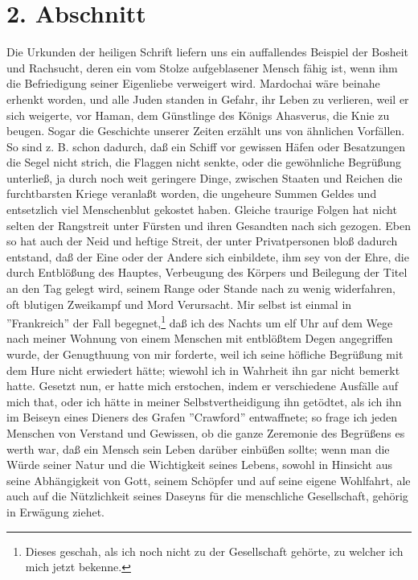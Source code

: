 \section{2. Abschnitt}

Die Urkunden der heiligen Schrift liefern uns ein auffallendes Beispiel der Bosheit und Rachsucht, deren ein vom Stolze aufgeblasener Mensch fähig ist, wenn ihm die Befriedigung seiner Eigenliebe verweigert wird. Mardochai wäre beinahe erhenkt worden, und alle Juden standen in Gefahr, ihr Leben zu verlieren, weil er sich weigerte, vor Haman, dem Günstlinge des Königs Ahasverus, die Knie zu beugen. Sogar die Geschichte unserer Zeiten erzählt uns von ähnlichen Vorfällen. So sind z. B. schon dadurch, daß ein Schiff vor gewissen Häfen oder Besatzungen die Segel nicht strich, die Flaggen nicht senkte, oder die gewöhnliche Begrüßung unterließ, ja durch noch weit geringere Dinge, zwischen Staaten und Reichen die furchtbarsten Kriege veranlaßt worden, die ungeheure Summen Geldes und entsetzlich viel Menschenblut gekostet haben. Gleiche traurige Folgen hat nicht selten der Rangstreit unter Fürsten und ihren Gesandten nach sich gezogen. Eben so hat auch der Neid und heftige Streit, der unter Privatpersonen bloß dadurch entstand, daß der Eine oder der Andere sich einbildete, ihm sey von der Ehre, die durch Entblößung des Hauptes, Verbeugung des Körpers und Beilegung der Titel an den Tag gelegt wird, seinem Range oder Stande nach zu wenig widerfahren, oft blutigen Zweikampf und Mord Verursacht. Mir selbst ist einmal in ''Frankreich'' der Fall begegnet,\footnote{Dieses geschah, als ich noch nicht zu der Gesellschaft gehörte, zu welcher ich mich jetzt bekenne.} daß ich des Nachts um elf Uhr auf dem Wege nach meiner Wohnung von einem Menschen mit entblößtem Degen angegriffen wurde, der Genugthuung von mir forderte, weil ich seine höfliche Begrüßung mit dem Hure nicht erwiedert hätte; wiewohl ich in Wahrheit ihn gar nicht bemerkt hatte. Gesetzt nun, er hatte mich erstochen, indem er verschiedene Ausfälle auf mich that, oder ich hätte in meiner Selbstvertheidigung ihn getödtet, als ich ihn im Beiseyn eines Dieners des Grafen ''Crawford'' entwaffnete; so frage ich jeden Menschen von Verstand und Gewissen, ob die ganze Zeremonie des Begrüßens es werth war, daß ein Mensch sein Leben darüber einbüßen sollte; wenn man die Würde seiner Natur und die Wichtigkeit seines Lebens, sowohl in Hinsicht aus seine Abhängigkeit von Gott, seinem Schöpfer und auf seine eigene Wohlfahrt, ale auch auf die Nützlichkeit seines Daseyns für die menschliche Gesellschaft, gehörig in Erwägung ziehet.

